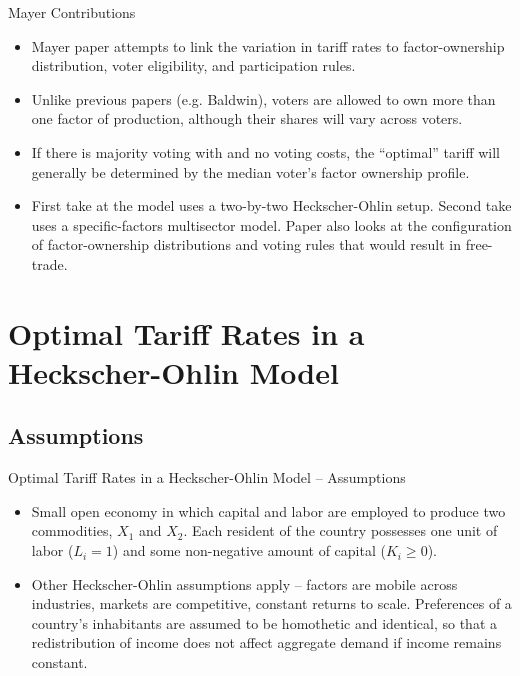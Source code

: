 \documentclass[aspectratio=169]{beamer}
\begin{document}

\begin{frame}{Mayer Contributions}
    
\begin{itemize}
    \item<1-> Mayer paper attempts to link the variation in tariff rates to factor-ownership distribution, voter eligibility, and participation rules.
    \item<2-> Unlike previous papers (e.g. Baldwin), voters are allowed to own more than one factor of production, although their shares will vary across voters.
    \item<3-> If there is majority voting with and no voting costs, the ``optimal” tariff will generally be determined by the median voter’s factor ownership profile.
    \item<4-> First take at the model uses a two-by-two Heckscher-Ohlin setup.  Second take uses a specific-factors multisector model.  Paper also looks at the configuration of factor-ownership distributions and voting rules that would result in free-trade.
\end{itemize}

\end{frame}


\section{Optimal Tariff Rates in a Heckscher-Ohlin Model}

\subsection{Assumptions}


\begin{frame}{Optimal Tariff Rates in a Heckscher-Ohlin Model – Assumptions}

\begin{itemize}
    \item<1-> Small open economy in which capital and labor are employed to produce two commodities, $ X_{1} $ and  $ X_{2} $.  Each resident of the country possesses one unit of labor ($ L_{i} =  1 $) and some non-negative amount of capital ($ K_{i} \ge 0 $).
    \item<2-> Other Heckscher-Ohlin assumptions apply – factors are mobile across industries, markets are competitive, constant returns to scale.  Preferences of a country’s inhabitants are assumed to be homothetic and identical, so that a redistribution of income does not affect aggregate demand if income remains constant.
\end{itemize}
    
\end{frame}
\end{document}
